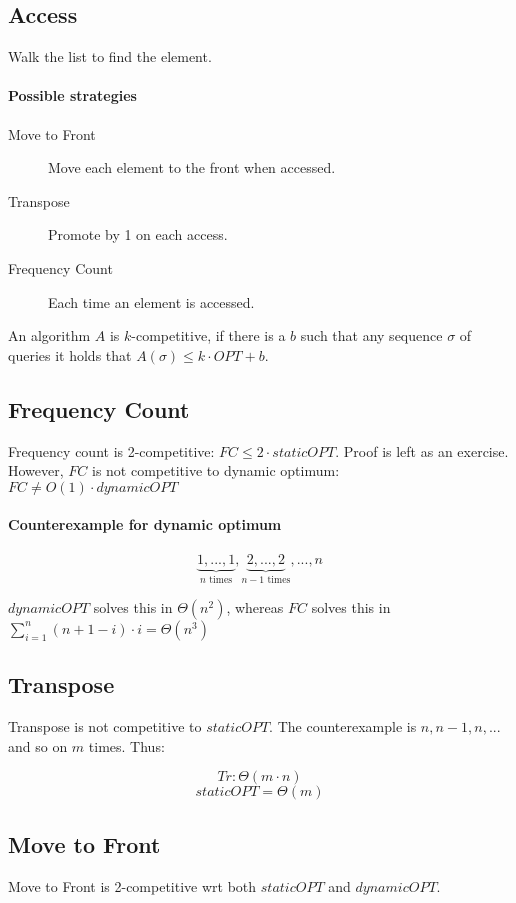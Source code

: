 \documentclass[a4paper]{article}
\begin{document}
\subsection{Access}
Walk the list to find the element.

\paragraph{Possible strategies}
\begin{description}
  \item[Move to Front] Move each element to the front when accessed.
  \item[Transpose] Promote by 1 on each access.
  \item[Frequency Count] Each time an element is accessed.
\end{description}

An algorithm $A$ is $k$-competitive, if there is a $b$ such that any sequence $\sigma$ of queries it holds that $A(\sigma) \le k\cdot OPT + b$.

\subsection{Frequency Count}
Frequency count is 2-competitive: $FC \le 2\cdot staticOPT$. Proof is left as an exercise. However, $FC$ is not competitive to dynamic optimum: $FC \ne O(1)\cdot dynamicOPT$

\paragraph{Counterexample for dynamic optimum}
\[\underbrace{1,...,1}_{\text{$n$ times}},\underbrace{2,...,2}_{\text{$n-1$ times}},...,n\]

$dynamicOPT$ solves this in $\Theta(n^2)$, whereas $FC$ solves this in $\sum_{i=1}^n(n+1-i)\cdot i=\Theta(n^3)$

\subsection{Transpose}
Transpose is not competitive to $staticOPT$. The counterexample is $n, n-1, n,...$ and so on $m$ times. Thus:

\[Tr: \Theta(m\cdot n)\]
\[staticOPT=\Theta(m)\]

\subsection{Move to Front}
Move to Front is 2-competitive wrt both $staticOPT$ and $dynamicOPT$.
\end{document}
